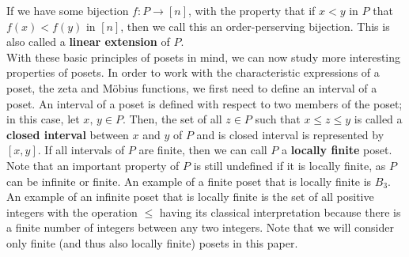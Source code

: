 \documentclass{article} %
\theoremstyle{definition}
\theoremstyle{plain}
\begin{document}
If we have some bijection $f: P \rightarrow [n]$, with the property that if $x < y$ in $P$ that $f(x) < f(y)$ in $[n]$, then we call this an order-perserving bijection. This is also called a \textbf{linear extension} of $P$. \\ %

With these basic principles of posets in mind, we can now study more interesting properties of posets. In order to work with the characteristic expressions of a poset, the zeta and M\"{o}bius functions, we first need to define an interval of a poset. An interval of a poset is defined with respect to two members of the poset; in this case, let $x, \, y \in P$. Then, the set of all $z \in P$ such that $x \leq z \leq y$ is called a \textbf{closed interval} between $x$ and $y$ of $P$ and is closed interval is represented by $[x, y]$. If all intervals of $P$ are finite, then we can call $P$ a \textbf{locally finite} poset. Note that an important property of $P$ is still undefined if it is locally finite, as $P$ can be infinite or finite. An example of a finite poset that is locally finite is $B_{3}$. An example of an infinite poset that is locally finite is the set of all positive integers with the operation $\leq$ having its classical interpretation because there is a finite number of integers between any two integers. Note that we will consider only finite (and thus also locally finite) posets in this paper. \\

\end{document}

